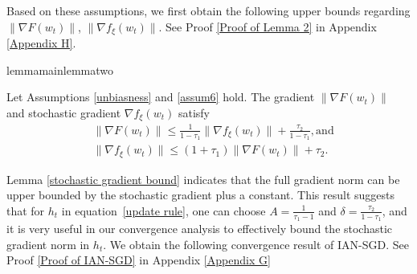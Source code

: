 \documentclass[10pt]{article} %
\def\eqref#1{equation~\ref{#1}}
\newtheorem{remark}{Remark}
\begin{document}
Based on these assumptions, we first obtain the following upper bounds regarding $\|\nabla F(w_t) \|$, $\|\nabla f_{\xi}(w_t) \|$. See Proof \ref{Proof of Lemma 2} in Appendix \ref{Appendix H}.
\begin{restatable}{lemma}{mainlemmatwo}
\label{stochastic gradient bound}
    
    Let Assumptions \ref{unbiasness} and \ref{assum6} hold. The gradient $\|\nabla F(w_t) \|$ and stochastic gradient $\nabla f_{\xi}(w_t)$ satisfy 
    \begin{align}
        &\|\nabla F(w_t) \|\leq \frac{1}{1-\tau_1}\|\nabla f_{\xi}(w_t) \|+\frac{\tau_2}{1-\tau_1},\text{and}\nonumber\\
        &\|\nabla f_{\xi}(w_t)\|\leq (1+\tau_1)\|\nabla F(w_t) \|+\tau_2.
    \end{align}
\end{restatable}
Lemma \ref{stochastic gradient bound} indicates that the full gradient norm can be upper bounded by
the stochastic gradient plus a constant. This result suggests that for $h_t$ in \eqref{update rule}, one can choose $A=\frac{1}{\tau_1-1}$ and $\delta = \frac{\tau_2}{1-\tau_1}$, and it is very useful in our convergence analysis to effectively bound the stochastic gradient norm in $h_t$. We obtain the following convergence result of IAN-SGD. See Proof \ref{Proof of IAN-SGD} in Appendix \ref{Appendix G}
\end{document}
